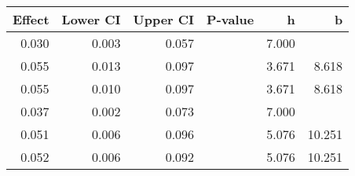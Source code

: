 \begin{table}[ht]
\centering
\begin{tabular}{rrrrrr}
  \hline
Effect & Lower CI & Upper CI & P-value & h & b \\ 
  \hline
0.030 & 0.003 & 0.057 &  & 7.000 &  \\ 
  0.055 & 0.013 & 0.097 &  & 3.671 & 8.618 \\ 
  0.055 & 0.010 & 0.097 &  & 3.671 & 8.618 \\ 
  0.037 & 0.002 & 0.073 &  & 7.000 &  \\ 
  0.051 & 0.006 & 0.096 &  & 5.076 & 10.251 \\ 
  0.052 & 0.006 & 0.092 &  & 5.076 & 10.251 \\ 
   \hline
\end{tabular}
\end{table}
